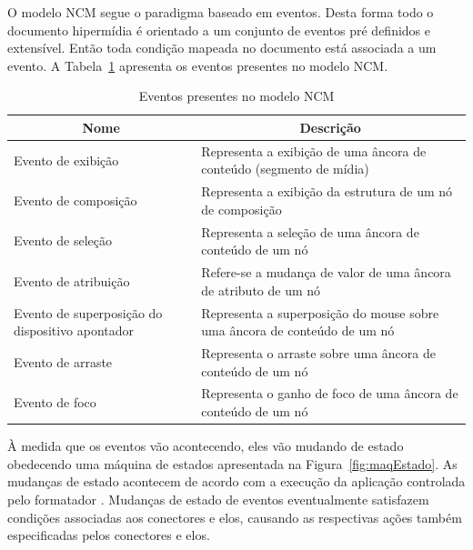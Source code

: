 O modelo NCM segue o paradigma baseado em eventos. Desta forma todo o documento hipermídia é orientado a um conjunto de eventos pré definidos e extensível. Então toda condição mapeada no documento está associada a um evento. A Tabela~\ref{tab:eventosNCM} apresenta os eventos presentes no modelo NCM.

\begin{table}[!ht]
\label{tab:eventosNCM}
\caption{Eventos presentes no modelo NCM}
\centering
{
  \renewcommand\arraystretch{1.25}
  \begin{tabular}{|p{5cm}|p{10cm}|} \hline
   \multicolumn{1}{|c|}{Nome} & \multicolumn{1}{c|}{Descrição}  \\ \hline 
  
    Evento de exibição & Representa a exibição de uma âncora de conteúdo (segmento de mídia) \\  \hline

    Evento de composição &  Representa a exibição da estrutura de um nó de composição \\  \hline

    Evento de seleção & Representa a seleção de uma âncora de conteúdo de um nó \\  \hline

    Evento de atribuição & Refere-se a mudança de valor de uma âncora de atributo de um nó \\  \hline

    Evento de superposição do dispositivo apontador & Representa a superposição do mouse sobre uma âncora de conteúdo de um nó \\  \hline
 
    Evento de arraste & Representa o arraste sobre uma âncora de conteúdo de um nó \\  \hline

    Evento de foco & Representa o ganho de foco de uma âncora de conteúdo de um nó \\  \hline

  \end{tabular}
}
\end{table}

À medida que os eventos vão acontecendo, eles vão mudando de estado obedecendo uma máquina de estados apresentada na Figura~\ref{fig:maqEstado}. As mudanças de estado acontecem de acordo com a execução da aplicação controlada pelo formatador \cite{rodrigues2003formataccao}. Mudanças de estado de eventos eventualmente satisfazem condições associadas aos conectores e elos, causando as respectivas ações também especificadas pelos conectores e elos.

